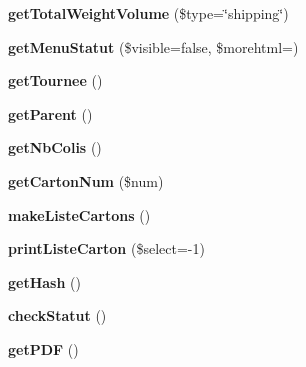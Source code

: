 \begin{DoxyCompactItemize}
{\bfseries get\+Total\+Weight\+Volume} (\$type=\char`\"{}shipping\char`\"{})
\item 
\mbox{\label{classTourneeUnique__lines__cmde__elt_a5a7668b87ebbc72efc6ecac6c61f5bea}} 
{\bfseries get\+Menu\+Statut} (\$visible=false, \$morehtml=\textquotesingle{}\textquotesingle{})
\item 
\mbox{\label{classTourneeUnique__lines__cmde__elt_a85521318e18cea4d4f5c53c4bc294c65}} 
{\bfseries get\+Tournee} ()
\item 
\mbox{\label{classTourneeUnique__lines__cmde__elt_a075f7b1b194965842e4b7c7d7f67bcc7}} 
{\bfseries get\+Parent} ()
\item 
\mbox{\label{classTourneeUnique__lines__cmde__elt_a75c62ad8d14f767163adeb7624e9d440}} 
{\bfseries get\+Nb\+Colis} ()
\item 
\mbox{\label{classTourneeUnique__lines__cmde__elt_a960e035dc5d29013ea293a0a9dc0590f}} 
{\bfseries get\+Carton\+Num} (\$num)
\item 
\mbox{\label{classTourneeUnique__lines__cmde__elt_a12f94bd157c754645c4fd18690d1d1db}} 
{\bfseries make\+Liste\+Cartons} ()
\item 
\mbox{\label{classTourneeUnique__lines__cmde__elt_a004569a7f457e06cc1b5090d4e487653}} 
{\bfseries print\+Liste\+Carton} (\$select=-\/1)
\item 
\mbox{\label{classTourneeUnique__lines__cmde__elt_a8ffb6fc51986ff92bc83aefe855ee6a8}} 
{\bfseries get\+Hash} ()
\item 
\mbox{\label{classTourneeUnique__lines__cmde__elt_aa5080bda9987906c256a8c5f1b339787}} 
{\bfseries check\+Statut} ()
\item 
\mbox{\label{classTourneeUnique__lines__cmde__elt_aa68a2a8cb065dbb78a42ae6704886a57}} 
{\bfseries get\+P\+DF} ()
\end{DoxyCompactItemize}
